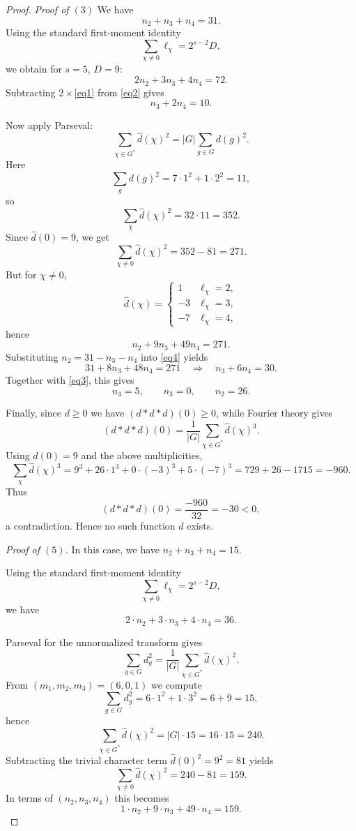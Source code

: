 \documentclass[12pt,twoside,]{amsart}
\theoremstyle{plain}
\theoremstyle{definition}
\begin{document}
\begin{proof}
\noindent\textit{Proof of $(3)$} We have
\begin{equation}\label{eq1}
n_2+n_3+n_4=31.
\end{equation}
Using the standard first-moment identity
\[
\sum_{\chi\neq 0}\ell_\chi=2^{s-2}D,
\]
we obtain for $s=5$, $D=9$:
\begin{equation}\label{eq2}
2n_2+3n_3+4n_4=72.
\end{equation}
Subtracting $2\times$\eqref{eq1} from \eqref{eq2} gives
\begin{equation}\label{eq3}
n_3+2n_4=10.
\end{equation}

Now apply Parseval:
\[
\sum_{\chi\in G^*}\widehat d(\chi)^2
=|G|\sum_{g\in G} d(g)^2.
\]
Here
\[
\sum_{g} d(g)^2 = 7\cdot 1^2 + 1\cdot 2^2 = 11,
\]
so
\[
\sum_{\chi}\widehat d(\chi)^2 = 32\cdot 11 = 352.
\]
Since $\widehat d(0)=9$, we get
\[
\sum_{\chi\neq 0}\widehat d(\chi)^2 = 352-81=271.
\]
But for $\chi\neq 0$,
\[
\widehat d(\chi)=
\begin{cases}
1 & \ell_\chi=2,\\
-3 & \ell_\chi=3,\\
-7 & \ell_\chi=4,
\end{cases}
\]
hence
\begin{equation}\label{eq4}
n_2+9n_3+49n_4=271.
\end{equation}
Substituting $n_2=31-n_3-n_4$ into \eqref{eq4} yields
\[
31+8n_3+48n_4=271
\quad\Rightarrow\quad
n_3+6n_4=30.
\]
Together with \eqref{eq3}, this gives
\[
n_4=5,\qquad n_3=0,\qquad n_2=26.
\]

Finally, since $d\ge 0$ we have $(d*d*d)(0)\ge 0$, while Fourier theory gives
\[
(d*d*d)(0)=\frac{1}{|G|}\sum_{\chi\in G^*}\widehat d(\chi)^3.
\]
Using $\widehat d(0)=9$ and the above multiplicities,
\[
\sum_{\chi}\widehat d(\chi)^3
=9^3+26\cdot 1^3+0\cdot(-3)^3+5\cdot(-7)^3
=729+26-1715=-960.
\]
Thus
\[
(d*d*d)(0)=\frac{-960}{32}=-30<0,
\]
a contradiction. Hence no such function $d$ exists.

\noindent\textit{Proof of $(5)$.} In this case, we have $n_2+n_3+n_4=15$.

Using the standard first-moment identity
\[
\sum_{\chi\neq 0}\ell_\chi=2^{s-2}D,
\]
we have 
\begin{equation}\label{eq:firstmoment}
2\cdot n_2 + 3\cdot n_3 + 4\cdot n_4= 36.
\end{equation}

Parseval for the unnormalized transform gives
\[
\sum_{g\in G} d_g^2=\frac1{|G|}\sum_{\chi\in G^*}\widehat d(\chi)^2.
\]
From $(m_1,m_2,m_3)=(6,0,1)$ we compute
\[
\sum_{g\in G} d_g^2 = 6\cdot 1^2 + 1\cdot 3^2 = 6+9=15,
\]
hence
\[
\sum_{\chi\in G^*}\widehat d(\chi)^2 = |G|\cdot 15 = 16\cdot 15=240.
\]
Subtracting the trivial character term $\widehat d(0)^2=9^2=81$ yields
\[
\sum_{\chi\neq 0}\widehat d(\chi)^2 = 240-81=159.
\]
In terms of $(n_2,n_3,n_4)$ this becomes
\begin{equation}\label{eq:secondmoment}
1\cdot n_2 + 9\cdot n_3 + 49\cdot n_4 =159.
\end{equation}


\end{proof}
\end{document}

